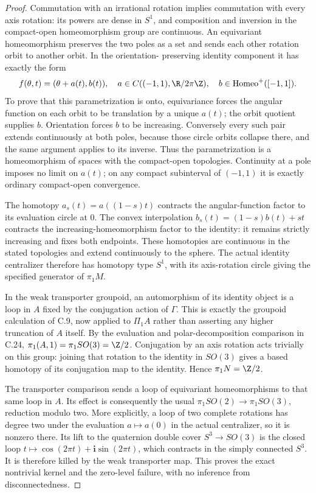 \begin{proof}
Commutation with an irrational rotation implies commutation with every
axis rotation: its powers are dense in $S^1$, and composition and
inversion in the compact-open homeomorphism group are continuous.
An equivariant homeomorphism preserves the two poles as a set and
sends each other rotation orbit to another orbit. In the orientation-
preserving identity component it has exactly the form
\[
 f(\theta,t)=(\theta+a(t),b(t)),\quad
 a\in C((-1,1),\R/2\pi\Z),\quad
 b\in\operatorname{Homeo}^+([-1,1]).
\]
To prove that this parametrization is onto, equivariance forces the
angular function on each orbit to be translation by a unique $a(t)$;
the orbit quotient supplies $b$. Orientation forces $b$ to be increasing.
Conversely every such pair extends continuously at both poles, because
those circle orbits collapse there, and the same argument applies to
its inverse. Thus the parametrization is a homeomorphism of spaces
with the compact-open topologies. Continuity at a pole imposes no
limit on $a(t)$; on any compact subinterval of $(-1,1)$ it is exactly
ordinary compact-open convergence.

The homotopy $a_s(t)=a((1-s)t)$ contracts the angular-function factor
to its evaluation circle at $0$. The convex interpolation
$b_s(t)=(1-s)b(t)+st$ contracts the increasing-homeomorphism factor
to the identity: it remains strictly increasing and fixes both endpoints.
These homotopies are continuous in the stated topologies and extend
continuously to the sphere. The actual identity centralizer therefore
has homotopy type $S^1$, with its axis-rotation circle giving the
specified generator of $\pi_1M$.

In the weak transporter groupoid, an automorphism of its identity
object is a loop in $A$ fixed by the conjugation action of $\Gamma$.
This is exactly the groupoid calculation of C.9, now applied to
$\Pi_1A$ rather than asserting any higher truncation of $A$ itself.
By the evaluation and polar-decomposition comparison in C.24,
$\pi_1(A,1)=\pi_1SO(3)=\Z/2$. Conjugation by an axis rotation acts
trivially on this group: joining that rotation to the identity in
$SO(3)$ gives a based homotopy of its conjugation map to the identity.
Hence $\pi_1N=\Z/2$.

The transporter comparison sends a loop of equivariant homeomorphisms
to that same loop in $A$. Its effect is consequently the usual
$\pi_1SO(2)\to\pi_1SO(3)$, reduction modulo two. More explicitly,
a loop of two complete rotations has degree two under the evaluation
$a\mapsto a(0)$ in the actual centralizer, so it is nonzero there.
Its lift to the quaternion double cover $S^3\to SO(3)$ is the closed
loop $t\mapsto\cos(2\pi t)+\mathbf i\sin(2\pi t)$, which contracts
in the simply connected $S^3$. It is therefore killed by the weak
transporter map. This proves the exact nontrivial kernel and the
zero-level failure, with no inference from disconnectedness.
\end{proof}
